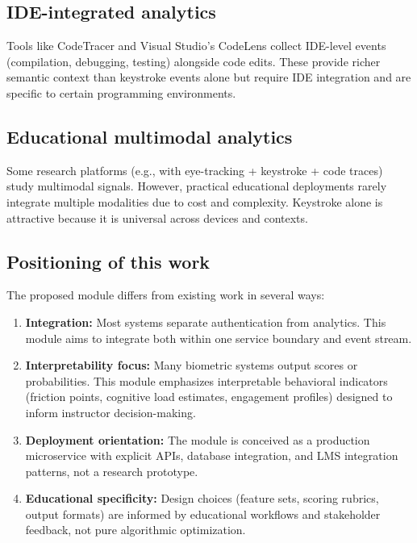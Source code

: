 \subsection{IDE-integrated analytics}

Tools like CodeTracer and Visual Studio's CodeLens collect IDE-level events (compilation, debugging, testing) alongside code edits. These provide richer semantic context than keystroke events alone but require IDE integration and are specific to certain programming environments.

\subsection{Educational multimodal analytics}

Some research platforms (e.g., with eye-tracking + keystroke + code traces) study multimodal signals. However, practical educational deployments rarely integrate multiple modalities due to cost and complexity. Keystroke alone is attractive because it is universal across devices and contexts.

\subsection{Positioning of this work}

The proposed module differs from existing work in several ways:

\begin{enumerate}
  \item \textbf{Integration:} Most systems separate authentication from analytics. This module aims to integrate both within one service boundary and event stream.
  
  \item \textbf{Interpretability focus:} Many biometric systems output scores or probabilities. This module emphasizes interpretable behavioral indicators (friction points, cognitive load estimates, engagement profiles) designed to inform instructor decision-making.
  
  \item \textbf{Deployment orientation:} The module is conceived as a production microservice with explicit APIs, database integration, and LMS integration patterns, not a research prototype.
  
  \item \textbf{Educational specificity:} Design choices (feature sets, scoring rubrics, output formats) are informed by educational workflows and stakeholder feedback, not pure algorithmic optimization.
\end{enumerate}

